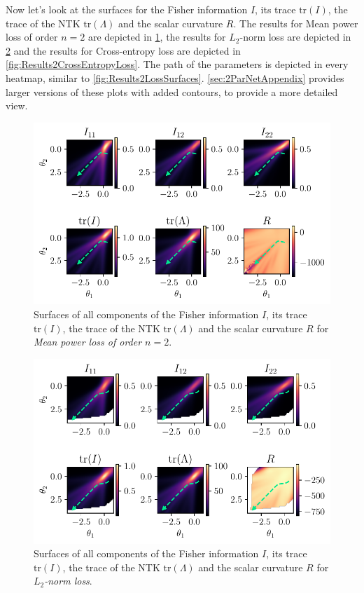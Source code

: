 Now let's look at the surfaces for the Fisher information $I$, its trace $\mathrm{tr}(I)$, the trace of the NTK $\mathrm{tr}(\Lambda)$ and the scalar curvature $R$. The results for Mean power loss of order $n=2$ are depicted in \cref{fig:Results2MeanPowerLoss}, the results for $L_2$-norm loss are depicted in \cref{fig:Results2LPNormLoss} and the results for Cross-entropy loss are depicted in \cref{fig:Results2CrossEntropyLoss}. The path of the parameters is depicted in every heatmap, similar to \cref{fig:Results2LossSurfaces}. \cref{sec:2ParNetAppendix} provides larger versions of these plots with added contours, to provide a more detailed view.\\
\begin{figure}
	\centering
	\includegraphics{Experiment2/plots/MeanPowerLoss2_tracecomparison.pdf}
	\caption{Surfaces of all components of the Fisher information $I$, its trace $\mathrm{tr}(I)$, the trace of the NTK $\mathrm{tr}(\Lambda)$ and the scalar curvature $R$ for \emph{Mean power loss of order $n=2$}.}
	\label{fig:Results2MeanPowerLoss}
\end{figure}
\begin{figure}
	\centering
	\includegraphics{Experiment2/plots/LPNormLoss2_tracecomparison.pdf}
	\caption{Surfaces of all components of the Fisher information $I$, its trace $\mathrm{tr}(I)$, the trace of the NTK $\mathrm{tr}(\Lambda)$ and the scalar curvature $R$ for \emph{$L_2$-norm loss}.}
	\label{fig:Results2LPNormLoss}
\end{figure}
